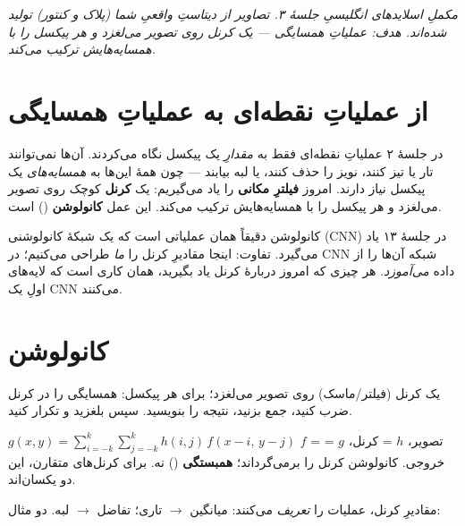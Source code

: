 \documentclass[12pt,a4paper]{article}
\begin{document}

{\small\itshape مکملِ اسلایدهای انگلیسیِ جلسهٔ ۳. تصاویر از دیتاستِ واقعیِ شما (پلاک و کنتور) تولید شده‌اند. هدف: عملیاتِ همسایگی — یک کرنل روی تصویر می‌لغزد و هر پیکسل را با همسایه‌هایش ترکیب می‌کند.}

\vspace{0.5cm}
\tableofcontents
\vspace{1cm}

\section{از عملیاتِ نقطه‌ای به عملیاتِ همسایگی}

در جلسهٔ ۲ عملیاتِ نقطه‌ای فقط به \emph{مقدارِ} یک پیکسل نگاه می‌کردند. آن‌ها نمی‌توانند تار یا
تیز کنند، نویز را حذف کنند، یا لبه بیابند — چون همهٔ این‌ها به \emph{همسایه‌های} یک پیکسل نیاز
دارند. امروز \textbf{فیلترِ مکانی} را یاد می‌گیریم: یک \textbf{کرنل} کوچک روی تصویر می‌لغزد و هر
پیکسل را با همسایه‌هایش ترکیب می‌کند. این عمل \textbf{کانولوشن} () است.

\begin{nokte}
کانولوشن دقیقاً همان عملیاتی است که یک شبکهٔ کانولوشنی (CNN) در جلسهٔ ۱۳ یاد می‌گیرد. تفاوت:
اینجا مقادیرِ کرنل را \emph{ما} طراحی می‌کنیم؛ در CNN شبکه آن‌ها را از داده \emph{می‌آموزد}. هر
چیزی که امروز دربارهٔ کرنل یاد بگیرید، همان کاری است که لایه‌های اولِ یک CNN می‌کنند.
\end{nokte}

\section{کانولوشن}

یک کرنل (فیلتر/ماسک) روی تصویر می‌لغزد؛ برای هر پیکسل: همسایگی را در کرنل ضرب کنید، جمع بزنید،
نتیجه را بنویسید. سپس بلغزید و تکرار کنید.

\begin{riyazi}
$g(x,y) = \displaystyle\sum_{i=-k}^{k}\sum_{j=-k}^{k} h(i,j)\, f(x-i,\,y-j)$
\newline
$f$ = تصویر، $h$ = کرنل، $g$ = خروجی. کانولوشن کرنل را برمی‌گرداند؛ \textbf{همبستگی}
() نه. برای کرنل‌های متقارن، این دو یکسان‌اند.
\end{riyazi}

مقادیرِ کرنل، عملیات را \emph{تعریف} می‌کنند: میانگین $\rightarrow$ تاری؛ تفاضل $\rightarrow$
لبه. دو مثال:
\end{document}
